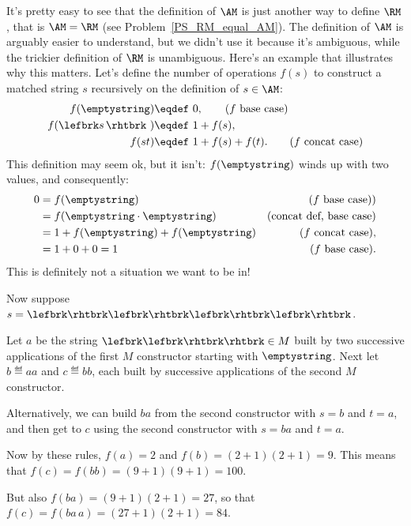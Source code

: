 It's pretty easy to see that the definition of $\AM$ is just another
way to define $\RM$, that is $\AM = \RM$ (see
Problem~\ref{PS_RM_equal_AM}).  The definition of $\AM$ is arguably
easier to understand, but we didn't use it because it's ambiguous,
while the trickier definition of $\RM$ is unambiguous.  Here's an
example that illustrates why this matters.  Let's define the number of
operations $f(s)$ to construct a matched string $s$ recursively on the
definition of $s \in \AM$:
\begin{align*}
  f(\emptystring)        & \eqdef\ 0, \tag{$f$ base case}\\
  f(\lefbrk s\,\rhtbrk\ ) & \eqdef\ 1+ f(s), \\
  f(st)                  & \eqdef\ 1+ f(s) +f(t).\tag{$f$ concat case}
\end{align*}
This definition may seem ok, but it isn't:
$f(\emptystring)$ winds up with two values, and consequently:
\begin{align*}
0 & = f(\emptystring) & \text{($f$ base case))}\\
  & = f(\emptystring \cdot \emptystring) & \text{(concat def, base case)} \\
                & = 1 + f(\emptystring) + f(\emptystring)
                      &  \text{($f$ concat case)},\\
                & = 1 + 0 + 0 = 1
                      & \text{($f$ base case)}.
\end{align*}
This is definitely not a situation we want to be in!


\iffalse

Now suppose $s = \lefbrk\rhtbrk\lefbrk\rhtbrk\lefbrk\rhtbrk\lefbrk\rhtbrk$.



Let $a$ be the string $\lefbrk\lefbrk\rhtbrk\rhtbrk \in M$ built by two successive
applications of the first $M$ constructor starting with $\emptystring$.  Next
let $b \eqdef aa$ and $c \eqdef bb$, each built by successive applications
of the second $M$ constructor.

Alternatively, we can build $ba$ from the second constructor with $s=b$
and $t=a$, and then get to $c$ using the second constructor with $s=ba$
and $t=a$.

Now by these rules, $f(a) = 2$ and $f(b) = (2+1)(2+1)=9$.  This means
that $f(c) = f(bb)= (9+1)(9+1)=100$.

But also $f(ba) = (9+1)(2+1) = 27$, so that $f(c) = f(ba\,a) = (27 +1)
(2+1) = 84$.

